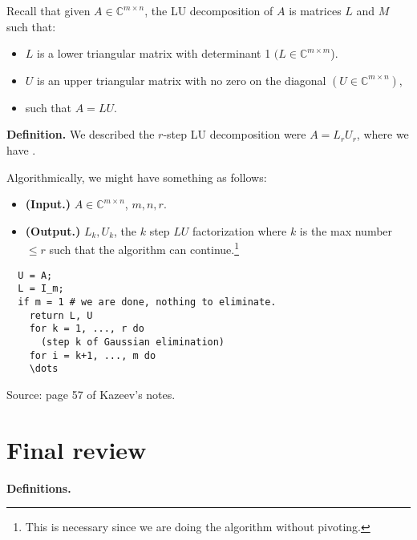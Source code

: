 \documentclass{article}
\newcommand{\CC}{\mathbb{C}}
\begin{document}
Recall that given $A \in \mathbb{C}^{m \times n}$, the LU decomposition of $A$ is matrices $L$ and $M$ such that:
\begin{itemize}
  \item $L$ is a lower triangular matrix with determinant 1 $(L \in \CC^{m \times m}$).
  \item $U$ is an upper triangular matrix with no zero on the diagonal $(U \in \CC^{m \times n})$,
  \item such that $A = LU$.
\end{itemize}

{\bf Definition.} We described the $r$-step LU decomposition were $A = L_r U_r$, where we have .

Algorithmically, we might have something as follows:

\begin{itemize}
  \item \textbf{(Input.)} $A \in \CC^{m \times n}$, $m, n, r$.
  \item \textbf{(Output.)} $L_k, U_k$, the $k$ step $LU$ factorization where $k$ is the max number $\leq r$ such that the algorithm can continue.\footnote{This is necessary since we are doing the algorithm without pivoting.}
\end{itemize}

\begin{verbatim}
  U = A;
  L = I_m;
  if m = 1 # we are done, nothing to eliminate.
    return L, U
    for k = 1, ..., r do
      (step k of Gaussian elimination)
    for i = k+1, ..., m do
    \dots
\end{verbatim}

Source: page 57 of Kazeev's notes.


\section{Final review}

{\bf Definitions.}
\end{document}
